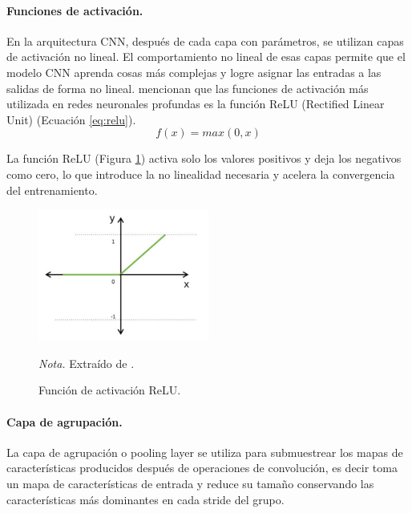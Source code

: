 \paragraph{Funciones de activación.}
En la arquitectura CNN, después de cada capa con parámetros, se utilizan capas de activación no lineal. 
El comportamiento no lineal de esas capas permite que el modelo CNN aprenda cosas más complejas y logre asignar las entradas a las salidas de forma no lineal. \citet{balas_recent_2020} 
mencionan que las funciones de activación más utilizada en redes neuronales profundas es la función ReLU (Rectified Linear Unit) (Ecuación \ref{eq:relu}).
\begin{equation}
    f(x) = max(0,x)
    \label{eq:relu}
\end{equation}

La función ReLU (Figura \ref{fig:relu}) activa solo los valores positivos y deja los negativos como cero, lo que introduce la no linealidad necesaria y acelera la convergencia del entrenamiento.
\begin{figure}[H]
    \centering
    \caption{Función de activación ReLU.}
    \includegraphics[width=0.5\textwidth]{img/4_marco_teorico/relu_function.png}
    \label{fig:relu}
    \begin{flushleft}
        \textit{Nota.} Extraído de \citet{balas_recent_2020}. 
        \vspace{-\baselineskip}       
    \end{flushleft}  
\end{figure}

\paragraph{Capa de agrupación.}
La capa de agrupación o pooling layer se utiliza para submuestrear los mapas de características producidos después de operaciones de convolución,
es decir toma un mapa de características de entrada y reduce su tamaño conservando las características más dominantes en cada stride del grupo. 

